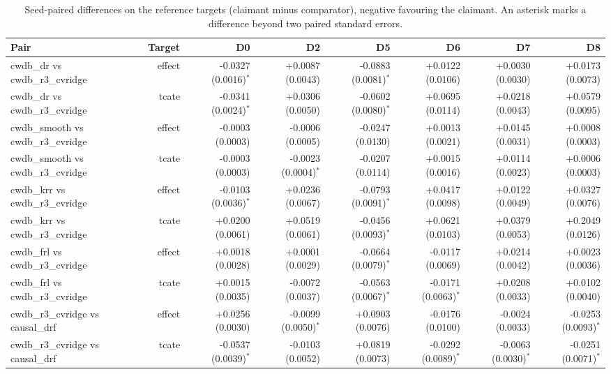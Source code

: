 \begin{table}[htbp]
\centering
\caption{Seed-paired differences on the reference targets (claimant minus comparator), negative favouring the claimant. An asterisk marks a difference beyond two paired standard errors.}
\label{tab:p6-trackA-paired-ref}
\small
\begin{tabular}{@{}lrrrrrrr@{}}
\toprule
Pair & Target & D0 & D2 & D5 & D6 & D7 & D8 \\ 
\midrule
cwdb\_dr vs cwdb\_r3\_cvridge & effect & -0.0327 (0.0016)$^\ast$ & +0.0087 (0.0043) & -0.0883 (0.0081)$^\ast$ & +0.0122 (0.0106) & +0.0030 (0.0030) & +0.0173 (0.0073) \\ 
cwdb\_dr vs cwdb\_r3\_cvridge & tcate & -0.0341 (0.0024)$^\ast$ & +0.0306 (0.0050) & -0.0602 (0.0080)$^\ast$ & +0.0695 (0.0114) & +0.0218 (0.0043) & +0.0579 (0.0095) \\ 
cwdb\_smooth vs cwdb\_r3\_cvridge & effect & -0.0003 (0.0003) & -0.0006 (0.0005) & -0.0247 (0.0130) & +0.0013 (0.0021) & +0.0145 (0.0031) & +0.0008 (0.0003) \\ 
cwdb\_smooth vs cwdb\_r3\_cvridge & tcate & -0.0003 (0.0003) & -0.0023 (0.0004)$^\ast$ & -0.0207 (0.0114) & +0.0015 (0.0016) & +0.0114 (0.0023) & +0.0006 (0.0003) \\ 
cwdb\_krr vs cwdb\_r3\_cvridge & effect & -0.0103 (0.0036)$^\ast$ & +0.0236 (0.0067) & -0.0793 (0.0091)$^\ast$ & +0.0417 (0.0098) & +0.0122 (0.0049) & +0.0327 (0.0076) \\ 
cwdb\_krr vs cwdb\_r3\_cvridge & tcate & +0.0200 (0.0061) & +0.0519 (0.0061) & -0.0456 (0.0093)$^\ast$ & +0.0621 (0.0103) & +0.0379 (0.0053) & +0.2049 (0.0126) \\ 
cwdb\_frl vs cwdb\_r3\_cvridge & effect & +0.0018 (0.0028) & +0.0001 (0.0029) & -0.0664 (0.0079)$^\ast$ & -0.0117 (0.0069) & +0.0214 (0.0042) & +0.0023 (0.0036) \\ 
cwdb\_frl vs cwdb\_r3\_cvridge & tcate & +0.0015 (0.0035) & -0.0072 (0.0037) & -0.0563 (0.0067)$^\ast$ & -0.0171 (0.0063)$^\ast$ & +0.0208 (0.0033) & +0.0102 (0.0040) \\ 
cwdb\_r3\_cvridge vs causal\_drf & effect & +0.0256 (0.0030) & -0.0099 (0.0050)$^\ast$ & +0.0903 (0.0076) & -0.0176 (0.0100) & -0.0024 (0.0033) & -0.0253 (0.0093)$^\ast$ \\ 
cwdb\_r3\_cvridge vs causal\_drf & tcate & -0.0537 (0.0039)$^\ast$ & -0.0103 (0.0052) & +0.0819 (0.0073) & -0.0292 (0.0089)$^\ast$ & -0.0063 (0.0030)$^\ast$ & -0.0251 (0.0071)$^\ast$ \\ 
\bottomrule
\end{tabular}
\end{table}


